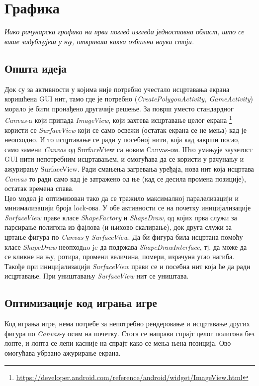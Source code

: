 
\chapter{Графика} \label{Graphics}

\emph{Иако рачунарска графика на први поглед изгледа једноставна област, што се више задубљујеш у њу, откриваш каква озбиљна наука стоји. }

\section{Општа идеја}
Док су за активности у којима није потребно учестало исцртавања екрана коришћена GUI нит, тамо где је потребно (\emph{CreatePolygonActivity, GameActivity}) морало је бити пронађено другачије решење. За површ уместо стандардног \emph{Canvas}-a који припада \emph{ImageView}, који захтева исцртавање целог екрана \footnote{\url{https://developer.android.com/reference/android/widget/ImageView.html}} користи се \emph{SurfaceView} који се само освежи (остатак екрана се не мења) кад је неопходно. И то исцртавање се ради у посебној нити, која кад заврши посао, само замени \emph{Canvas} од SurfaceView са новим Canvas-ом. Што умањује заузетост GUI нити непотребним исцртавањем, и омогућава да се користи у рачунању и ажурирању SurfaceView.
Ради смањења загревања уређаја, нова нит која исцртава \emph{Canvas} то ради само кад је затражено од ње (кад се десила промена позиције), остатак времена спава. 
\\ \indent
 Цео модел је оптимизован тако да се тражило максималној паралелизацији и минимализацији броја lock-ова. У обе активности се на почетку иницијализације \emph{SurfaceView} правe класе \emph{ShapeFactory} и \emph{ShapeDraw}, од којих прва служи за парсирање полигона из фајлова (и њихово скалирање), док друга служи за цртање фигура по \emph{Canvas}-у \emph{SurfaceView}. Да би фигура била исцртана помоћу класе \emph{ShapeDraw} неопходno je да подржава \emph{ShapeDrawInterface}, тј. да може да се кликне на њу, ротира, промени величина, помери, израчуна угао нагиба. Такође при иницијализацији \emph{SurfaceView} прави се и посебна нит која ће да ради исцртавање. При уништавању \emph{SurfaceView} нит се уништава.
\section{Оптимизације код играња игре}
 Код играња игре, нема потребе за непотребно рендеровање и исцртавање других фигура по \emph{Canvas}-у осим на почетку. Стога се направи спрајт целог полигона без лопте, и лопта се лепи касније на спрајт како се мења њена позиција. Ово омогућава убрзано ажурирање екрана.